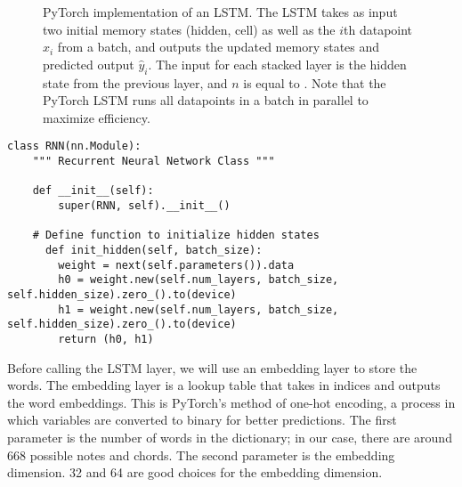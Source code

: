 \begin{figure}[H]

  \caption{PyTorch implementation of an LSTM.
          The LSTM takes as input two initial memory states (hidden, cell) as well as the $i$th datapoint $x_i$ from a batch, and outputs the updated memory states and predicted output $\hat{y}_i$.
          The input for each stacked layer is the hidden state from the previous layer, and $n$ is equal to .
          Note that the PyTorch LSTM runs all datapoints in a batch in parallel to maximize efficiency.
          }
  \label{figure:lstm}
\end{figure}

\begin{lstlisting}
class RNN(nn.Module):
    """ Recurrent Neural Network Class """

    def __init__(self):
        super(RNN, self).__init__()

    # Define function to initialize hidden states
	  def init_hidden(self, batch_size):
        weight = next(self.parameters()).data
        h0 = weight.new(self.num_layers, batch_size, self.hidden_size).zero_().to(device)
        h1 = weight.new(self.num_layers, batch_size, self.hidden_size).zero_().to(device)
        return (h0, h1)

\end{lstlisting}

Before calling the LSTM layer, we will use an embedding layer to store the words.
The embedding layer is a lookup table that takes in indices and outputs the word embeddings.
This is PyTorch's method of one-hot encoding, a process in which variables are converted to binary for better predictions.
The first parameter is the number of words in the dictionary; in our case, there are around 668 possible notes and chords. %
The second parameter is the embedding dimension.
32 and 64 are good choices for the embedding dimension.


